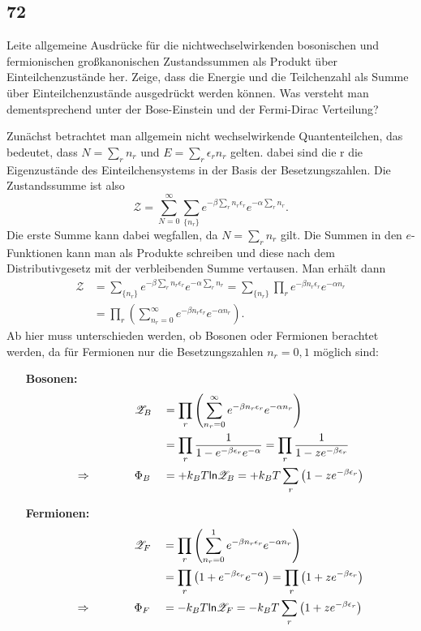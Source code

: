 \subsection{72}
\begin{myfrag}
Leite allgemeine Ausdrücke für die nichtwechselwirkenden bosonischen und
fermionischen großkanonischen Zustandssummen als Produkt über Einteilchenzustände
her. Zeige, dass die Energie und die Teilchenzahl als
Summe über Einteilchenzustände ausgedrückt werden können. Was versteht
man dementsprechend unter der Bose-Einstein und der Fermi-Dirac
Verteilung?
\end{myfrag}
Zunächst betrachtet man allgemein nicht wechselwirkende Quantenteilchen, das bedeutet, dass $N=\sum\limits_rn_r$ und $E=\sum\limits_r\epsilon_rn_r$ gelten. dabei sind die \ket r die Eigenzustände des Einteilchensystems in der Basis der Besetzungszahlen. Die Zustandssumme ist also
\begin{equation}
	\mathscr Z=\sum\limits_{N=0}^\infty\sum\limits_{\lbrace n_r\rbrace}e^{-\beta\sum\limits_rn_r\epsilon_r}e^{-\alpha\sum\limits_rn_r}.
\end{equation}
Die erste Summe kann dabei wegfallen, da $N=\sum\limits_rn_r$ gilt. Die Summen in den $e$-Funktionen kann man als Produkte schreiben und diese nach dem Distributivgesetz mit der verbleibenden Summe vertausen. Man erhält dann
\begin{align}
	\mathscr Z&=\sum\limits_{\lbrace n_r\rbrace}e^{-\beta\sum\limits_rn_r\epsilon_r}e^{-\alpha\sum\limits_rn_r}=\sum\limits_{\lbrace n_r\rbrace}\prod\limits_re^{-\beta n_r\epsilon_r}e^{-\alpha n_r}\nonumber\\
	&=\prod\limits_r\left(\sum\limits_{n_r=0}^\infty e^{-\beta n_r\epsilon_r}e^{-\alpha n_r}\right).
\end{align}
Ab hier muss unterschieden werden, ob Bosonen oder Fermionen berachtet werden, da für Fermionen nur die Besetzungszahlen $n_r=0,1$ möglich sind:
\begin{itemize}
	\item[\textbf{Bosonen:}]{
	\begin{alignat}{2}
		&\mathscr Z_B&&=\prod\limits_r\left(\sum\limits_{n_r=0}^\infty e^{-\beta n_r\epsilon_r}e^{-\alpha n_r}\right)\nonumber\\
		&&&=\prod\limits_r\frac{1}{1-e^{-\beta\epsilon_r}e^{-\alpha}}=\prod\limits_r\frac{1}{1-ze^{-\beta\epsilon_r}}\\
		\Rightarrow\qquad\qquad&\Phi_B&&=+k_BT\mathsf{ln}\mathscr Z_B=+k_BT\sum\limits_r\left(1-ze^{-\beta\epsilon_r}\right)
	\end{alignat}}
	\item[\textbf{Fermionen:}]{
	\begin{alignat}{2}
		&\mathscr Z_F&&=\prod\limits_r\left(\sum\limits_{n_r=0}^1 e^{-\beta n_r\epsilon_r}e^{-\alpha n_r}\right)\nonumber\\
		&&&=\prod\limits_r\left(1+e^{-\beta\epsilon_r}e^{-\alpha}\right)=\prod\limits_r\left(1+ze^{-\beta\epsilon_r}\right)\\
		\Rightarrow\qquad\qquad&\Phi_F&&=-k_BT\mathsf{ln}\mathscr Z_F=-k_BT\sum\limits_r\left(1+ze^{-\beta\epsilon_r}\right)
	\end{alignat}}
\end{itemize}

